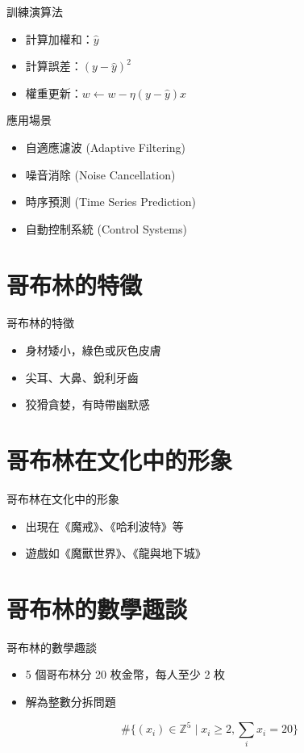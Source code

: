 \documentclass{beamer}
\begin{document}
\begin{frame}{訓練演算法}
  \begin{itemize}
    \item 計算加權和：$\hat y$
    \item 計算誤差：$(y-\hat y)^2$
    \item 權重更新：$w\leftarrow w-\eta(y-\hat y)x$
  \end{itemize}
\end{frame}

\begin{frame}{應用場景}
  \begin{itemize}
    \item 自適應濾波 (Adaptive Filtering)
    \item 噪音消除 (Noise Cancellation)
    \item 時序預測 (Time Series Prediction)
    \item 自動控制系統 (Control Systems)
  \end{itemize}
\end{frame}

\section{哥布林的特徵}
\begin{frame}{哥布林的特徵}
  \begin{itemize}
    \item 身材矮小，綠色或灰色皮膚
    \item 尖耳、大鼻、銳利牙齒
    \item 狡猾貪婪，有時帶幽默感
  \end{itemize}
\end{frame}

\section{哥布林在文化中的形象}
\begin{frame}{哥布林在文化中的形象}
  \begin{itemize}
    \item 出現在《魔戒》、《哈利波特》等
    \item 遊戲如《魔獸世界》、《龍與地下城》
  \end{itemize}
\end{frame}

\section{哥布林的數學趣談}
\begin{frame}{哥布林的數學趣談}
  \begin{itemize}
    \item 5 個哥布林分 20 枚金幣，每人至少 2 枚
    \item 解為整數分拆問題
  \end{itemize}
  \[
    \#\{(x_i)\in\mathbb{Z}^5\mid x_i\ge2,\sum_i x_i=20\}
  \]
\end{frame}
\end{document}
